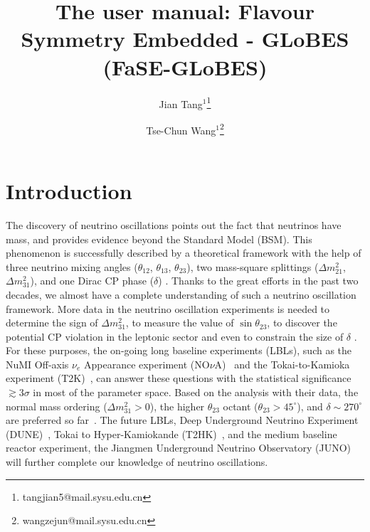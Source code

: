 \documentclass[aps,prd,nofootinbib,preprint]{revtex4}
\begin{document}
 
\title{\Large The user manual: Flavour Symmetry Embedded - GLoBES (FaSE-GLoBES)} %
\author{Jian Tang$^1$\footnote{tangjian5@mail.sysu.edu.cn}}
\author{Tse-Chun Wang$^1$\footnote{wangzejun@mail.sysu.edu.cn}}


\maketitle

\section{Introduction}\label{sec:intro}

The discovery of neutrino oscillations points out the fact that neutrinos have mass, and provides evidence beyond the Standard Model (BSM). This phenomenon is successfully described by a theoretical framework with the help of three neutrino mixing angles ($\theta_{12}$, $\theta_{13}$, $\theta_{23}$), two mass-square splittings ($\Delta m_{21}^2$, $\Delta m_{31}^2$), and one Dirac CP phase ($\delta$) \cite{Pontecorvo:1967fh,Maki:1962mu,Pontecorvo:1957qd,Esteban:2018azc}. Thanks to the great efforts in the past two decades, we almost have a complete understanding of such a neutrino oscillation framework. More data in the neutrino oscillation experiments is needed to determine the sign of $\Delta m_{31}^2$, to measure the value of $\sin\theta_{23}$, to discover the potential CP violation in the leptonic sector and even to constrain the size of $\delta$ \cite{Esteban:2018azc}. For these purposes, the on-going long baseline experiments (LBLs), such as the NuMI Off-axis $\nu_e$ Appearance experiment (NO$\nu$A)~\cite{Ayres:2007tu} and the Tokai-to-Kamioka experiment (T2K)~\cite{Abe:2011ks}, can answer these questions with the statistical significance $\gtrsim 3\sigma$ in most of the parameter space. Based on the analysis with their data, the normal mass ordering ($\Delta m_{31}^2>0$), the higher $\theta_{23}$ octant ($\theta_{23}>45^\circ$), and $\delta\sim270^\circ$ are preferred so far~\cite{Esteban:2018azc}. The future LBLs, Deep Underground Neutrino Experiment (DUNE)~\cite{Acciarri:2015uup}, Tokai to Hyper-Kamiokande (T2HK)~\cite{Abe:2014oxa}, and the medium baseline reactor experiment, the Jiangmen Underground Neutrino Observatory (JUNO)~\cite{Djurcic:2015vqa,An:2015jdp} will further complete our knowledge of neutrino oscillations.
\end{document}
